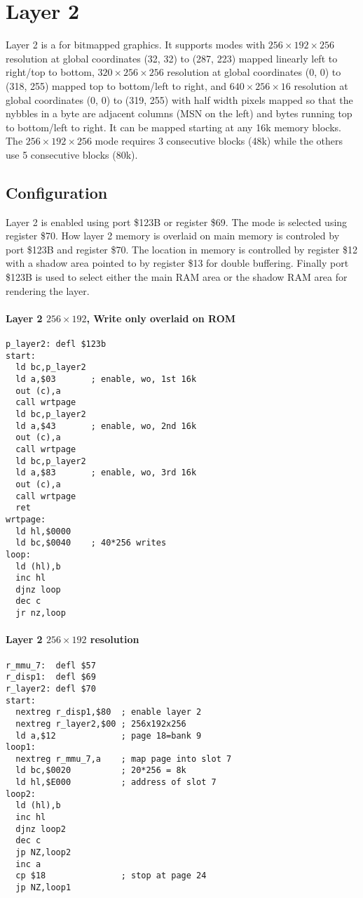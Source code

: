 \section{Layer 2}
Layer 2 is a for bitmapped graphics. It supports modes with
$256\times192\times256$ resolution at global coordinates (32, 32) to
(287, 223) mapped linearly left to right/top to bottom,
$320\times256\times256$ resolution at global coordinates (0, 0) to
(318, 255) mapped top to bottom/left to right, and
$640\times256\times16$ resolution at global coordinates (0, 0) to
(319, 255) with half width pixels mapped so that the nybbles in a byte
are adjacent columns (MSN on the left) and bytes running top to
bottom/left to right. It can be mapped starting at any 16k memory
blocks. The $256\times192\times256$ mode requires 3 consecutive blocks
(48k) while the others use 5 consecutive blocks (80k).

\subsection{Configuration}
Layer 2 is enabled using port \$123B or register \$69. The mode is
selected using register \$70. How layer 2 memory is overlaid on main
memory is controled by port \$123B and register \$70. The location in
memory is controlled by register \$12 with a shadow area pointed to by
register \$13 for double buffering. Finally port \$123B is used to
select either the main RAM area or the shadow RAM area for rendering
the layer.







\paragraph{Layer 2 $256\times192$, Write only overlaid on ROM}
\begin{verbatim}
p_layer2: defl $123b
start:
  ld bc,p_layer2
  ld a,$03       ; enable, wo, 1st 16k
  out (c),a
  call wrtpage
  ld bc,p_layer2
  ld a,$43       ; enable, wo, 2nd 16k
  out (c),a
  call wrtpage
  ld bc,p_layer2
  ld a,$83       ; enable, wo, 3rd 16k
  out (c),a
  call wrtpage
  ret
wrtpage:  
  ld hl,$0000
  ld bc,$0040    ; 40*256 writes
loop:
  ld (hl),b
  inc hl
  djnz loop
  dec c
  jr nz,loop
\end{verbatim}

\paragraph{Layer 2 $256\times192$ resolution}
\begin{verbatim}
r_mmu_7:  defl $57
r_disp1:  defl $69
r_layer2: defl $70
start:
  nextreg r_disp1,$80  ; enable layer 2
  nextreg r_layer2,$00 ; 256x192x256
  ld a,$12             ; page 18=bank 9
loop1:
  nextreg r_mmu_7,a    ; map page into slot 7
  ld bc,$0020          ; 20*256 = 8k
  ld hl,$E000          ; address of slot 7
loop2:
  ld (hl),b
  inc hl
  djnz loop2
  dec c
  jp NZ,loop2
  inc a
  cp $18               ; stop at page 24
  jp NZ,loop1
\end{verbatim}


